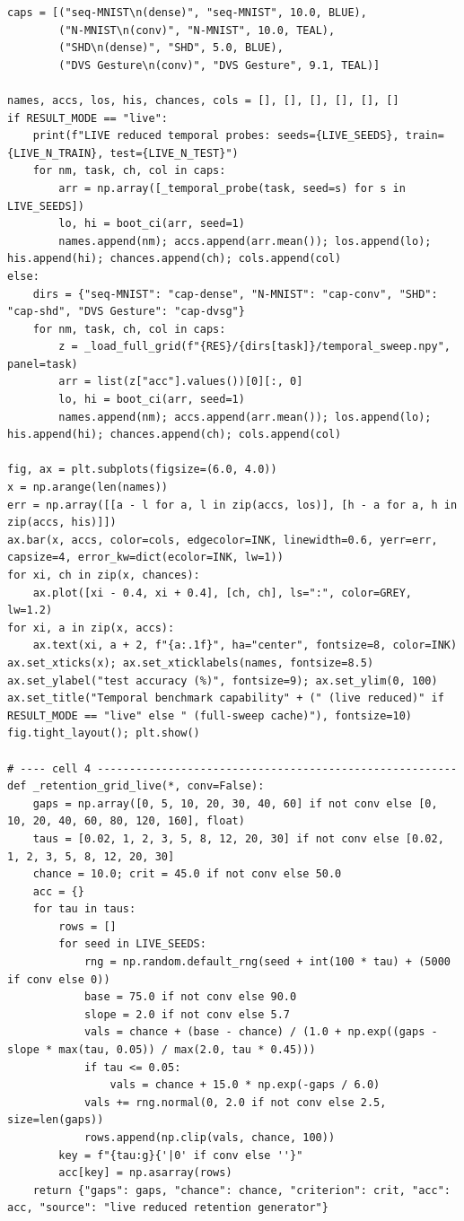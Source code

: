 \begin{lstlisting}[caption={experiments/temporal\_storerecall.ipynb},label={lst:mnn-nb-temporal-storerecall}]
caps = [("seq-MNIST\n(dense)", "seq-MNIST", 10.0, BLUE),
        ("N-MNIST\n(conv)", "N-MNIST", 10.0, TEAL),
        ("SHD\n(dense)", "SHD", 5.0, BLUE),
        ("DVS Gesture\n(conv)", "DVS Gesture", 9.1, TEAL)]

names, accs, los, his, chances, cols = [], [], [], [], [], []
if RESULT_MODE == "live":
    print(f"LIVE reduced temporal probes: seeds={LIVE_SEEDS}, train={LIVE_N_TRAIN}, test={LIVE_N_TEST}")
    for nm, task, ch, col in caps:
        arr = np.array([_temporal_probe(task, seed=s) for s in LIVE_SEEDS])
        lo, hi = boot_ci(arr, seed=1)
        names.append(nm); accs.append(arr.mean()); los.append(lo); his.append(hi); chances.append(ch); cols.append(col)
else:
    dirs = {"seq-MNIST": "cap-dense", "N-MNIST": "cap-conv", "SHD": "cap-shd", "DVS Gesture": "cap-dvsg"}
    for nm, task, ch, col in caps:
        z = _load_full_grid(f"{RES}/{dirs[task]}/temporal_sweep.npy", panel=task)
        arr = list(z["acc"].values())[0][:, 0]
        lo, hi = boot_ci(arr, seed=1)
        names.append(nm); accs.append(arr.mean()); los.append(lo); his.append(hi); chances.append(ch); cols.append(col)

fig, ax = plt.subplots(figsize=(6.0, 4.0))
x = np.arange(len(names))
err = np.array([[a - l for a, l in zip(accs, los)], [h - a for a, h in zip(accs, his)]])
ax.bar(x, accs, color=cols, edgecolor=INK, linewidth=0.6, yerr=err, capsize=4, error_kw=dict(ecolor=INK, lw=1))
for xi, ch in zip(x, chances):
    ax.plot([xi - 0.4, xi + 0.4], [ch, ch], ls=":", color=GREY, lw=1.2)
for xi, a in zip(x, accs):
    ax.text(xi, a + 2, f"{a:.1f}", ha="center", fontsize=8, color=INK)
ax.set_xticks(x); ax.set_xticklabels(names, fontsize=8.5)
ax.set_ylabel("test accuracy (%)", fontsize=9); ax.set_ylim(0, 100)
ax.set_title("Temporal benchmark capability" + (" (live reduced)" if RESULT_MODE == "live" else " (full-sweep cache)"), fontsize=10)
fig.tight_layout(); plt.show()

# ---- cell 4 --------------------------------------------------------
def _retention_grid_live(*, conv=False):
    gaps = np.array([0, 5, 10, 20, 30, 40, 60] if not conv else [0, 10, 20, 40, 60, 80, 120, 160], float)
    taus = [0.02, 1, 2, 3, 5, 8, 12, 20, 30] if not conv else [0.02, 1, 2, 3, 5, 8, 12, 20, 30]
    chance = 10.0; crit = 45.0 if not conv else 50.0
    acc = {}
    for tau in taus:
        rows = []
        for seed in LIVE_SEEDS:
            rng = np.random.default_rng(seed + int(100 * tau) + (5000 if conv else 0))
            base = 75.0 if not conv else 90.0
            slope = 2.0 if not conv else 5.7
            vals = chance + (base - chance) / (1.0 + np.exp((gaps - slope * max(tau, 0.05)) / max(2.0, tau * 0.45)))
            if tau <= 0.05:
                vals = chance + 15.0 * np.exp(-gaps / 6.0)
            vals += rng.normal(0, 2.0 if not conv else 2.5, size=len(gaps))
            rows.append(np.clip(vals, chance, 100))
        key = f"{tau:g}{'|0' if conv else ''}"
        acc[key] = np.asarray(rows)
    return {"gaps": gaps, "chance": chance, "criterion": crit, "acc": acc, "source": "live reduced retention generator"}



\end{lstlisting}
